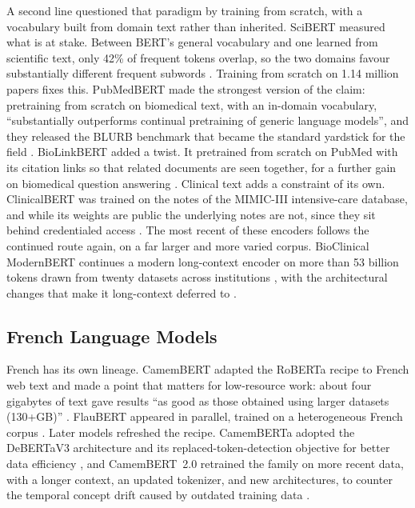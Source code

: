 A second line questioned that paradigm by training from scratch, with a vocabulary
built from domain text rather than inherited. SciBERT measured what is at stake.
Between BERT's general vocabulary and one learned from scientific text, only 42\% of
frequent tokens overlap, so the two domains favour substantially different frequent
subwords \citep{beltagy_scibert_2019}. Training from scratch
on 1.14 million papers fixes this. PubMedBERT made the strongest version of the claim:
pretraining from scratch on biomedical text, with an in-domain vocabulary, ``substantially
outperforms continual pretraining of generic language models'', and they released the
BLURB benchmark that became the standard yardstick for the field \citep{gu_domain-specific_2022}.
BioLinkBERT added a twist. It pretrained from scratch on PubMed with its citation links so
that related documents are seen together, for a further gain on biomedical question
answering \citep{yasunaga-etal-2022-linkbert}. Clinical text adds a constraint of its
own. ClinicalBERT was trained on the notes of the MIMIC-III intensive-care database, and
while its weights are public the underlying notes are not, since they sit behind credentialed
access \citep{alsentzer-etal-2019-publicly}. The most recent of these encoders follows the
continued route again, on a far larger and more varied corpus. BioClinical ModernBERT
continues a modern long-context encoder on more than 53 billion tokens drawn from twenty
datasets across institutions \citep{sounack2025bioclinicalmodernbert}, with the
architectural changes that make it long-context deferred to .

\subsection{French Language Models}

French has its own lineage. CamemBERT adapted the RoBERTa recipe to French web text and
made a point that matters for low-resource work: about four gigabytes of text gave
results ``as good as those obtained using larger datasets (130+GB)''
\citep{martin-etal-2020-camembert}. FlauBERT appeared in parallel, trained on a
heterogeneous French corpus \citep{le-etal-2020-flaubert}. Later models refreshed the
recipe. CamemBERTa adopted the DeBERTaV3 architecture and its replaced-token-detection
objective for better data efficiency \citep{antoun-etal-2023-camemberta}, and CamemBERT~2.0
retrained the family on more recent data, with a longer context, an updated tokenizer,
and new architectures, to counter the temporal concept drift caused by outdated training
data \citep{antoun2024camembert2}.

